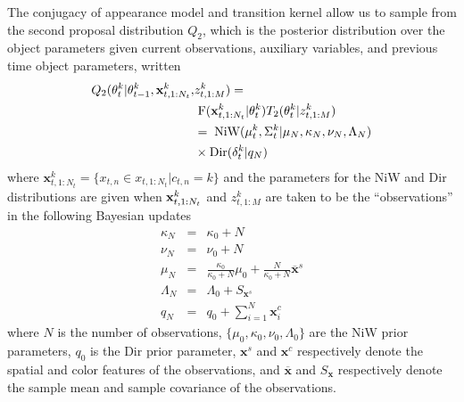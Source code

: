 \documentclass{article}
\begin{document}
The conjugacy of appearance model and transition kernel allow us to sample from the second proposal distribution $Q_2$, which is the posterior distribution over the object parameters given current observations, auxiliary variables, and previous time object parameters, written
\begin{align}
    \label{smc_proposal_2}
    \begin{split}
        Q_2(\theta_t^k | \theta_{t-1}^k,\mathbf{x}_{t,1:N_t}^k,&z_{t,1:M}^k) = \\
            &\hspace{1mm} \text{F}(\mathbf{x}_{t,1:N_t}^k | \theta_t^k) 
                T_2(\theta_t^k | z_{t,1:M}^k) \\
            &= \hspace{1mm} \text{NiW}(\mu_t^k, \Sigma_t^k | \mu_N, \kappa_N, \nu_N, \Lambda_N) \\
            &\times \text{Dir}( \delta_t^k | q_N)
    \end{split}
\end{align}
where $\mathbf{x}_{t,1:N_t}^k = \{ x_{t,n} \in x_{t,1:N_t} | c_{t,n}=k \} $ and the parameters for the NiW and Dir distributions are given when $\bold{x}_{t,1:N_{t}}^k$ and $z_{t,1:M}^k$ are taken to be the ``observations'' in the following Bayesian updates
\begin{eqnarray}
\label{bayesian_update_1}
    \kappa_N &=& \kappa_0 + N \\
\label{bayesian_update_2}
    \nu_N &=& \nu_0 + N \\
\label{bayesian_update_3}
    \mu_N &=& \frac{\kappa_0}{\kappa_0+N} \mu_0  +  \frac{N}{\kappa_0+N} \overline{\mathbf{x}}^{s}\\
\label{bayesian_update_4}
    \Lambda_N &=& \Lambda_0 + S_{\mathbf{x}^s}\\
\label{bayesian_update_5}
    q_N &=& q_0 + \sum_{i=1}^N \mathbf{x}_i^c
\end{eqnarray}
where $N$ is the number of observations, $\{ \mu_0, \kappa_0, \nu_0, \Lambda_0 \}$ are the NiW prior parameters, $q_0$ is the Dir prior parameter, $\mathbf{x}^s$ and $\mathbf{x}^c$ respectively denote the spatial and color features of the observations, and $\overline{\mathbf{x}}$ and $S_{\mathbf{x}}$ respectively denote the sample mean and sample covariance of the observations.

\end{document}
